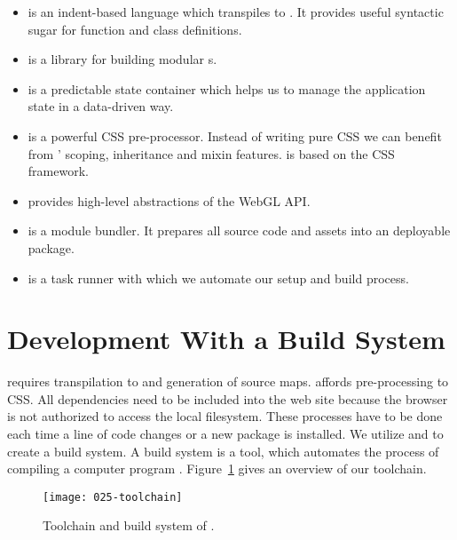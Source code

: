 \documentclass[../ClassicThesis.tex]{subfiles}
\begin{document}
\begin{itemize}
\item {\coffeescript} is an indent-based language which
  transpiles to {\javascript}. It provides useful syntactic
  sugar for function and class definitions.

\item {} is a {\javascript} library for building modular
  {\userinterface}s.

\item {} is a predictable state container which
  helps us to manage the application state in a data-driven
  way.

\item {} is a powerful CSS pre-processor. Instead
  of writing pure CSS we can benefit from '
  scoping, inheritance and mixin features. {\platener} is
  based on the  CSS framework.

\item \name{\threejs} provides high-level abstractions of
  the WebGL API.

\item {} is a module bundler. It prepares all
  source code and assets into an deployable package.

\item {} is a {\javascript} task runner with which
  we automate our setup and build process.
\end{itemize}

\section{Development With a Build System}

{\coffeescript} requires transpilation to {\javascript} and
generation of source maps.  affords
pre-processing to CSS. All dependencies need to be included
into the web site because the browser is not authorized to
access the local filesystem. These processes have to be done
each time a line of code changes or a new package is
installed. We utilize  and  to
create a build system. A build system is a tool, which
automates the process of compiling a computer program
\cite{build-system}. Figure~\ref{} gives an overview of our
toolchain.

\begin{figure}[h]
  \centering
  \texttt{[image: 025-toolchain]}
  \caption{Toolchain and build system of {\platener}.}
  \label{fig:toolchain}
\end{figure}
\end{document}
